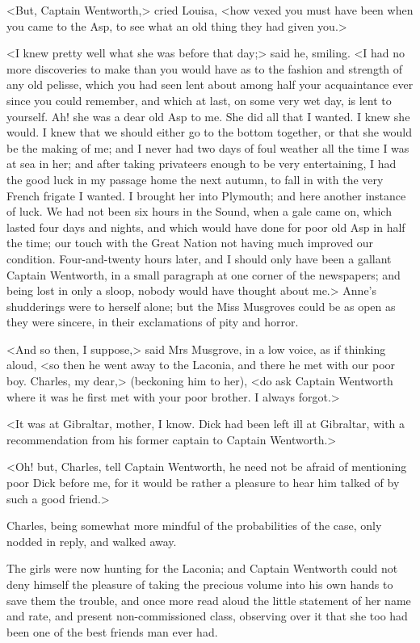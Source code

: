 <But, Captain Wentworth,> cried Louisa, <how vexed you must have been when you came to the Asp, to see what an old thing they had given you.>

<I knew pretty well what she was before that day;> said he, smiling. <I had no more discoveries to make than you would have as to the fashion and strength of any old pelisse, which you had seen lent about among half your acquaintance ever since you could remember, and which at last, on some very wet day, is lent to yourself. Ah! she was a dear old Asp to me. She did all that I wanted. I knew she would. I knew that we should either go to the bottom together, or that she would be the making of me; and I never had two days of foul weather all the time I was at sea in her; and after taking privateers enough to be very entertaining, I had the good luck in my passage home the next autumn, to fall in with the very French frigate I wanted. I brought her into Plymouth; and here another instance of luck. We had not been six hours in the Sound, when a gale came on, which lasted four days and nights, and which would have done for poor old Asp in half the time; our touch with the Great Nation not having much improved our condition. Four-and-twenty hours later, and I should only have been a gallant Captain Wentworth, in a small paragraph at one corner of the newspapers; and being lost in only a sloop, nobody would have thought about me.> Anne's shudderings were to herself alone; but the Miss Musgroves could be as open as they were sincere, in their exclamations of pity and horror.

<And so then, I suppose,> said Mrs Musgrove, in a low voice, as if thinking aloud, <so then he went away to the Laconia, and there he met with our poor boy. Charles, my dear,> (beckoning him to her), <do ask Captain Wentworth where it was he first met with your poor brother. I always forgot.>

<It was at Gibraltar, mother, I know. Dick had been left ill at Gibraltar, with a recommendation from his former captain to Captain Wentworth.>

<Oh! but, Charles, tell Captain Wentworth, he need not be afraid of mentioning poor Dick before me, for it would be rather a pleasure to hear him talked of by such a good friend.>

Charles, being somewhat more mindful of the probabilities of the case, only nodded in reply, and walked away.

The girls were now hunting for the Laconia; and Captain Wentworth could not deny himself the pleasure of taking the precious volume into his own hands to save them the trouble, and once more read aloud the little statement of her name and rate, and present non-commissioned class, observing over it that she too had been one of the best friends man ever had.

